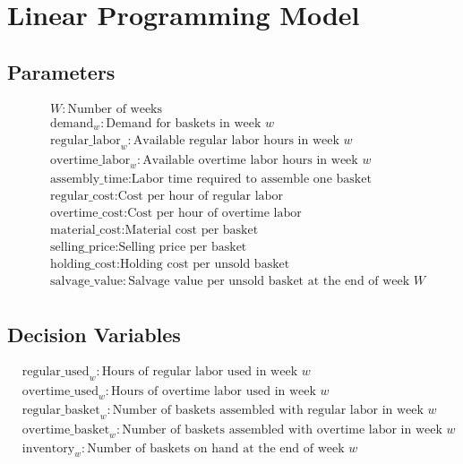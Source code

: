 \documentclass{article}
\begin{document}
\section*{Linear Programming Model}

\subsection*{Parameters}
\begin{align*}
    & W: \text{Number of weeks} \\
    & \text{demand}_w: \text{Demand for baskets in week } w \\
    & \text{regular\_labor}_w: \text{Available regular labor hours in week } w \\
    & \text{overtime\_labor}_w: \text{Available overtime labor hours in week } w \\
    & \text{assembly\_time}: \text{Labor time required to assemble one basket} \\
    & \text{regular\_cost}: \text{Cost per hour of regular labor} \\
    & \text{overtime\_cost}: \text{Cost per hour of overtime labor} \\
    & \text{material\_cost}: \text{Material cost per basket} \\
    & \text{selling\_price}: \text{Selling price per basket} \\
    & \text{holding\_cost}: \text{Holding cost per unsold basket} \\
    & \text{salvage\_value}: \text{Salvage value per unsold basket at the end of week } W \\
\end{align*}

\subsection*{Decision Variables}
\begin{align*}
    & \text{regular\_used}_w: \text{Hours of regular labor used in week } w \\
    & \text{overtime\_used}_w: \text{Hours of overtime labor used in week } w \\
    & \text{regular\_basket}_w: \text{Number of baskets assembled with regular labor in week } w \\
    & \text{overtime\_basket}_w: \text{Number of baskets assembled with overtime labor in week } w \\
    & \text{inventory}_w: \text{Number of baskets on hand at the end of week } w \\
\end{align*}
\end{document}
